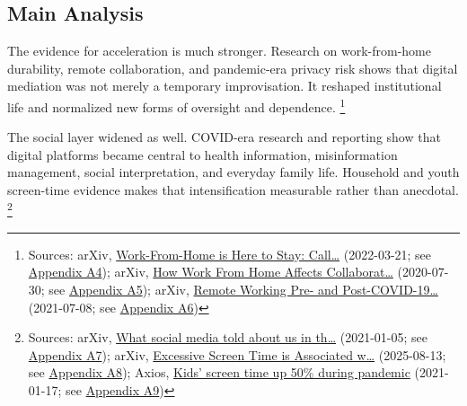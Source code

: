 \documentclass[
  american,
  11pt,
  letterpaper,
]{article}
\begin{document}
\subsection{Main Analysis}\label{main-analysis}

The evidence for acceleration is much stronger. Research on
work-from-home durability, remote collaboration, and pandemic-era
privacy risk shows that digital mediation was not merely a temporary
improvisation. It reshaped institutional life and normalized new forms
of oversight and dependence. \footnote{Sources: arXiv,
  \href{https://arxiv.org/abs/2203.11136}{Work-From-Home is Here to
  Stay: Call\ldots{}} (2022-03-21; see
  \hyperref[appendix-a4-work-from-home-is-here-to-stay-call-for-flexibility-in-post-pandemic-work-policies]{Appendix
  A4}); arXiv, \href{https://arxiv.org/abs/2007.15584}{How Work From
  Home Affects Collaborat\ldots{}} (2020-07-30; see
  \hyperref[appendix-a5-how-work-from-home-affects-collaboration-a-large-scale-study-of-information-workers-in-a-natural-experiment-during-covid-19]{Appendix
  A5}); arXiv, \href{https://arxiv.org/abs/2107.03907}{Remote Working
  Pre- and Post-COVID-19\ldots{}} (2021-07-08; see
  \hyperref[appendix-a6-remote-working-pre-and-post-covid-19-an-analysis-of-new-threats-and-risks-to-security-and-privacy]{Appendix
  A6})}

The social layer widened as well. COVID-era research and reporting show
that digital platforms became central to health information,
misinformation management, social interpretation, and everyday family
life. Household and youth screen-time evidence makes that
intensification measurable rather than anecdotal. \footnote{Sources:
  arXiv, \href{https://arxiv.org/abs/2101.01688}{What social media told
  about us in th\ldots{}} (2021-01-05; see
  \hyperref[appendix-a7-what-social-media-told-about-us-in-the-time-of-covid-19-a-scoping-review]{Appendix
  A7}); arXiv, \href{https://arxiv.org/abs/2508.10062}{Excessive Screen
  Time is Associated w\ldots{}} (2025-08-13; see
  \hyperref[appendix-a8-excessive-screen-time-is-associated-with-mental-health-problems-and-adhd-in-us-children-and-adolescents-physical-activity-and-sleep-as-parallel-mediators]{Appendix
  A8}); Axios,
  \href{https://www.axios.com/2021/01/17/kids-screen-time-pandemic}{Kids'
  screen time up 50\% during pandemic} (2021-01-17; see
  \hyperref[appendix-a9-kids-screen-time-up-50-during-pandemic]{Appendix
  A9})}
\end{document}
